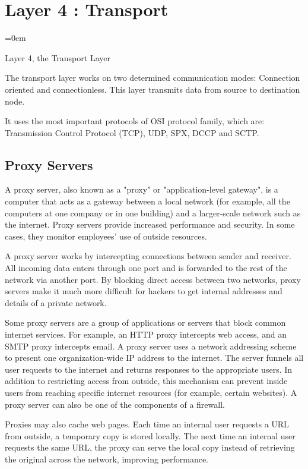 
\section{Layer 4 : Transport}
\label{sec:layer_4_transport}
\parindent=0em

Layer 4, the Transport Layer

The transport layer works on two determined communication modes: Connection oriented and connectionless. This layer transmits data from source to destination node.

It uses the most important protocols of OSI protocol family, which are: Transmission Control Protocol (TCP), UDP, SPX, DCCP and SCTP.
\subsection{Proxy Servers}
\label{ssec:proxy_servers}

A proxy server, also known as a "proxy" or "application-level gateway", is a
computer that acts as a gateway between a local network (for example, all the
computers at one company or in one building) and a larger-scale network such as
the internet. Proxy servers provide increased performance and security. In some
cases, they monitor employees' use of outside resources.

A proxy server works by intercepting connections between sender and receiver.
All incoming data enters through one port and is forwarded to the rest of the
network via another port. By blocking direct access between two networks, proxy
servers make it much more difficult for hackers to get internal addresses and
details of a private network.

Some proxy servers are a group of applications or servers that block common
internet services. For example, an HTTP proxy intercepts web access, and an SMTP
proxy intercepts email. A proxy server uses a network addressing scheme to
present one organization-wide IP address to the internet. The server funnels all
user requests to the internet and returns responses to the appropriate users. In
addition to restricting access from outside, this mechanism can prevent inside
users from reaching specific internet resources (for example, certain websites).
A proxy server can also be one of the components of a firewall.

Proxies may also cache web pages. Each time an internal user requests a URL from
outside, a temporary copy is stored locally. The next time an internal user
requests the same URL, the proxy can serve the local copy instead of retrieving
the original across the network, improving performance.

